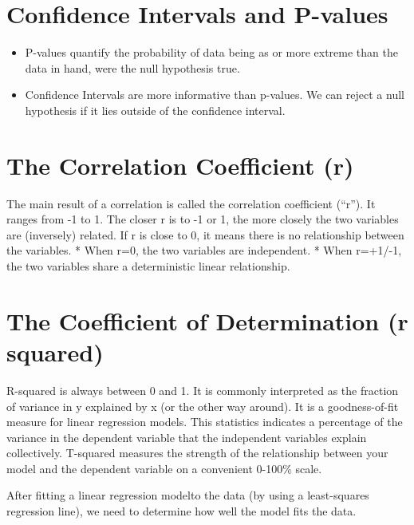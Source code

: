 \documentclass[
]{article}
\providecommand{\tightlist}{%
  \setlength{\itemsep}{0pt}\setlength{\parskip}{0pt}}
\begin{document}
\hypertarget{confidence-intervals-and-p-values}{%
\section{Confidence Intervals and
P-values}\label{confidence-intervals-and-p-values}}

\begin{itemize}
\tightlist
\item
  P-values quantify the probability of data being as or more extreme
  than the data in hand, were the null hypothesis true.\\
\item
  Confidence Intervals are more informative than p-values. We can reject
  a null hypothesis if it lies outside of the confidence interval.
\end{itemize}

\hypertarget{the-correlation-coefficient-r}{%
\section{The Correlation Coefficient
(r)}\label{the-correlation-coefficient-r}}

The main result of a correlation is called the correlation coefficient
(``r''). It ranges from -1 to 1. The closer r is to -1 or 1, the more
closely the two variables are (inversely) related. If r is close to 0,
it means there is no relationship between the variables. * When r=0, the
two variables are independent. * When r=+1/-1, the two variables share a
deterministic linear relationship.

\hypertarget{the-coefficient-of-determination-r-squared}{%
\section{The Coefficient of Determination (r
squared)}\label{the-coefficient-of-determination-r-squared}}

R-squared is always between 0 and 1. It is commonly interpreted as the
fraction of variance in y explained by x (or the other way around). It
is a goodness-of-fit measure for linear regression models. This
statistics indicates a percentage of the variance in the dependent
variable that the independent variables explain collectively. T-squared
measures the strength of the relationship between your model and the
dependent variable on a convenient 0-100\% scale.

After fitting a linear regression modelto the data (by using a
least-squares regression line), we need to determine how well the model
fits the data.
\end{document}
